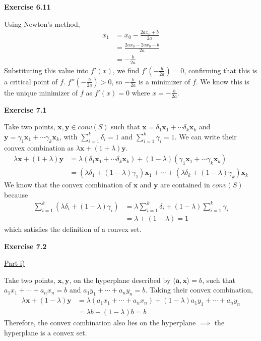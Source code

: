 \documentclass[letterpaper,12pt]{article}
\newcommand{\vect}[1]{\mathbf{#1}}
\begin{document}
\textbf{Exercise 6.11}

Using Newton's method,
\begin{align*}
x_1 &= x_0 - \frac{2a x_0 + b}{2a} \\
&=  \frac{ 2ax_0 - 2a x_0 - b}{2a} \\
&= -\frac{b}{2a}
\end{align*}
Substituting this value into $f'(x)$, we find $f'(-\frac{b}{2a}) = 0$, confirming that this is a critical point of $f$. $f''(-\frac{b}{2a}) > 0$, so $-\frac{b}{2a}$ is a minimizer of $f$. We know this is the unique minimizer of $f$ as $f'(x) = 0$ where $x = -\frac{b}{2a}$.

\textbf{Exercise 7.1}

Take two points, $\vect{x}, \vect{y} \in conv(S)$ such that $\vect{x} = \delta_1 \vect{x}_1 + \cdots \delta_k \vect{x}_k$ and $\vect{y} = \gamma_1 \vect{x}_1 + \cdots \gamma_k \vect{x}_k$, with $\sum_{i=1}^k \delta_i = 1$ and $\sum_{i=1}^k \gamma_i = 1$. We can write their convex combination as $\lambda \vect{x} + (1 + \lambda)\vect{y}$.
\begin{align*}
\lambda \vect{x} + (1 + \lambda)\vect{y} &=
\lambda (\delta_1 \vect{x}_1 + \cdots \delta_k \vect{x}_k) + (1 - \lambda)(\gamma_1 \vect{x}_1 + \cdots \gamma_k \vect{x}_k) \\ &=
(\lambda \delta_1 + (1 - \lambda) \gamma_1)\vect{x}_1 + \cdots + (\lambda \delta_k + (1 - \lambda) \gamma_k)\vect{x}_k
\end{align*}
We know that the convex combination of $\vect{x}$ and $\vect{y}$ are contained in $conv(S)$ because
\begin{align*}
\sum_{i=1}^k (\lambda \delta_i + (1 - \lambda) \gamma_i) &=
\lambda \sum_{i=1}^k \delta_i + (1 - \lambda) \sum_{i=1}^k \gamma_i \\ &=
\lambda + (1 - \lambda) = 1
\end{align*}
which satisfies the definition of a convex set.

\textbf{Exercise 7.2}

\underline{Part i)}

Take two points, $\vect{x}, \vect{y}$, on the hyperplane described by $\langle \vect{a}, \vect{x} \rangle = b$, such that $a_1x_1 + \cdots + a_nx_n = b$ and $a_1y_1 + \cdots + a_ny_n = b$. Taking their convex combination,
\begin{align*}
\lambda \vect{x} + (1 - \lambda) \vect{y} &= \lambda (a_1x_1 + \cdots + a_nx_n) + (1 - \lambda) a_1y_1 + \cdots + a_ny_n \\ &= \lambda b + (1 - \lambda) b = b
\end{align*}
Therefore, the convex combination also lies on the hyperplane $\implies$ the hyperplane is a convex set.
\end{document}

